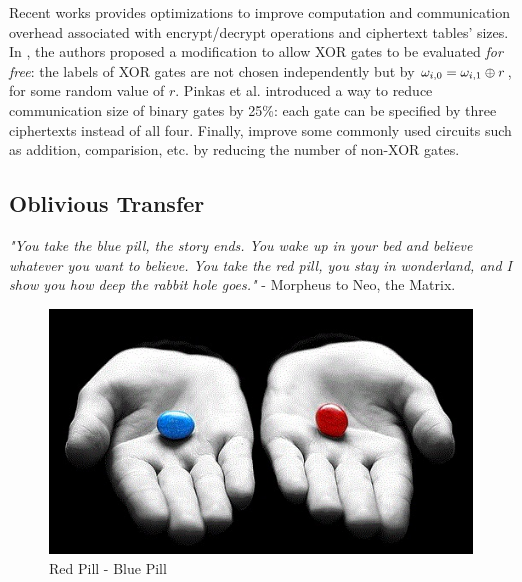 Recent works provides optimizations to improve computation and communication
overhead associated with encrypt/decrypt operations and ciphertext tables'
sizes. In \cite{kolesnikov2008improved30}, the authors proposed a modification to
allow XOR gates to be evaluated \textit{for free}: the labels of XOR gates are
not chosen independently but by \(\omega_{i,0} = \omega_{i,1} \oplus r\), for some
random value of \(r\). Pinkas et al. \cite{pinkas2009secure38} introduced a way to reduce communication size of binary gates by 25\%: each gate can be specified by three ciphertexts instead of all four. Finally, \cite{kolesnikov2009improved29} improve some commonly used circuits such as addition, comparision, etc. by reducing the number of non-XOR gates.

\subsection{Oblivious Transfer}
\label{sec:obliviousTransferPre}

\textit{"You take the blue pill, the story ends. You wake up in your bed and
  believe whatever you want to believe. You take the red pill, you stay in
  wonderland, and I show you how deep the rabbit hole goes."} - Morpheus to Neo,
the Matrix.


\begin{figure}[htbp!] 
\centering    
\includegraphics[width=1.0\textwidth]{Chapter2/Figs/Raster/RedPillBluePill}
\caption[Minion]{Red Pill - Blue Pill}
\label{fig:RedPillBluePill}
\end{figure}

